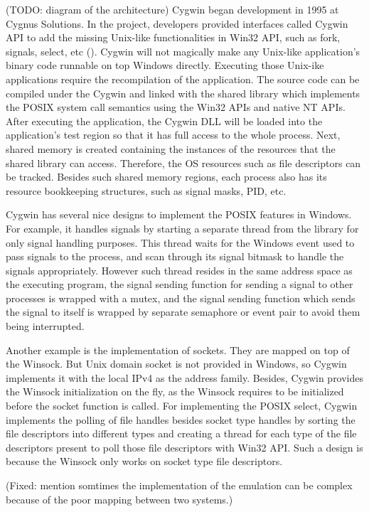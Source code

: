 (TODO: diagram of the architecture)
Cygwin began development in 1995 at Cygnus Solutions. In the project, developers provided interfaces called Cygwin API to add the missing Unix-like functionalities in Win32 API, such as fork, signals, select, etc (\cite{Cygwin}). Cygwin will not magically make any Unix-like application's binary code runnable on top  Windows directly. Executing those Unix-ike applications require the recompilation of the application. The source code can be compiled under the Cygwin and linked with the shared library which implements the POSIX system call semantics using the Win32 APIs and native NT APIs. After executing the application, the Cygwin DLL will be loaded into the application's test region so that it has full access to the whole process. Next, shared memory is created containing the instances of the resources that the shared library can access. Therefore, the OS resources such as file descriptors can be tracked. Besides such shared memory regions, each process also has its resource bookkeeping structures, such as signal masks, PID, etc.

Cygwin has several nice designs to implement the POSIX features in Windows. For example, it handles signals by starting a separate thread from the library for only signal handling purposes. This thread waits for the Windows event used to pass signals to the process, and scan through its signal bitmask to handle the signals appropriately. However such thread resides in the same address space as the executing program, the signal sending function for sending a signal to other processes is wrapped with a mutex, and the signal sending function which sends the signal to itself is wrapped by separate semaphore or event pair to avoid them being interrupted. 

Another example is the implementation of sockets. They are mapped on top of the Winsock. But Unix domain socket is not provided in Windows, so Cygwin implements it with the local IPv4 as the address family. Besides, Cygwin provides the Winsock initialization on the fly, as the Winsock requires to be initialized before the socket function is called. For implementing the POSIX select, Cygwin implements the polling of file handles besides socket type handles by sorting the file descriptors into different types and creating a thread for each type of the file descriptors present to poll those file descriptors with Win32 API. Such a design is because the Winsock only works on socket type file descriptors.

(Fixed: mention somtimes the implementation of the emulation can be complex because of the poor mapping between two systems.)              

